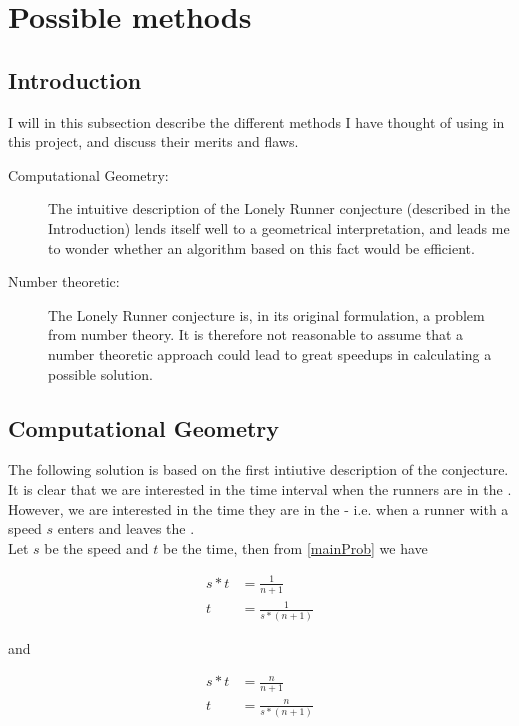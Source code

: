 \section{Possible methods}
\label{choiceOfMethod}

\subsection{Introduction}
I will in this subsection describe the different methods I have thought of using in this project, and discuss their merits and flaws.

\begin{description}
\item[Computational Geometry:] The intuitive description of the Lonely Runner conjecture (described in the Introduction) lends itself well to a geometrical interpretation, and leads me to wonder whether an algorithm based on this fact would be efficient.

\item[Number theoretic:] The Lonely Runner conjecture is, in its original formulation, a problem from number theory. It is therefore not reasonable to assume that a number theoretic approach could lead to great speedups in calculating a possible solution.
\end{description}

\subsection{Computational Geometry}

The following solution is based on the first intiutive description of the conjecture. It is clear that we are interested in the time interval when the runners are in the \zone. However, we are interested in the time they are in the \zone - i.e. when a runner with a speed $s$ enters and leaves the \zone.\\ 

Let $s$ be the speed and $t$ be the time, then from \ref{mainProb} we have 

\begin{equation}
\label{speedOne}
\begin{split}
s * t &= \frac{1}{n+1} \\
t &= \frac{1}{s * (n+1)}
\end{split}
\end{equation}

and 

\begin{equation}
\label{speedTwo}
\begin{split}
s * t &= \frac{n}{n+1} \\
t &= \frac{n}{s * (n+1)}
\end{split}
\end{equation}

